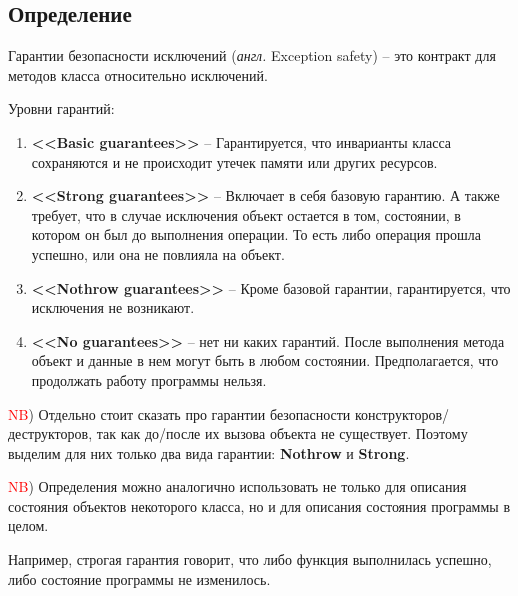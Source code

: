 \subsection{Определение}

Гарантии безопасности исключений (\textit{англ.} Exception safety) -- это контракт для методов класса относительно исключений.

Уровни гарантий:
\begin{enumerate}
\item \textbf{<<Basic guarantees>>} -- Гарантируется, что инварианты класса сохраняются и не происходит утечек памяти или других ресурсов.
\item \textbf{<<Strong guarantees>>} -- Включает в себя базовую гарантию. А также требует, что в случае исключения объект остается в том, состоянии, в котором он был до выполнения операции. То есть либо операция прошла успешно, или она не повлияла на объект.
\item \textbf{<<Nothrow guarantees>>} -- Кроме базовой гарантии, гарантируется, что исключения не возникают.
\item \textbf{<<No guarantees>>} -- нет ни каких гарантий. После выполнения метода объект и данные в нем могут быть в любом состоянии. Предполагается, что продолжать работу программы нельзя.
\end{enumerate}

\textcolor{red}{NB}) Отдельно стоит сказать про гарантии безопасности конструкторов/деструкторов, так как до/после их вызова объекта не существует. Поэтому выделим для них только два вида гарантии: \textbf{Nothrow} и \textbf{Strong}.

\textcolor{red}{NB}) Определения можно аналогично использовать не только для описания состояния объектов некоторого класса, но и для описания состояния программы в целом.

Например, строгая гарантия говорит, что либо функция выполнилась успешно, либо состояние программы не изменилось.



